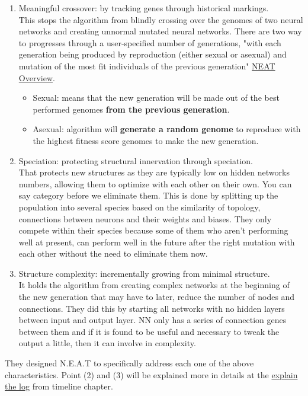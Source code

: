 \begin{enumerate} \label{list:3tweanns}
\item Meaningful crossover: by tracking genes through historical markings.\\
This stops the algorithm from blindly crossing over the genomes of two neural networks and creating unnormal mutated neural networks. There are two way to progresses through a user-specified number of generations, "with each generation being produced by reproduction (either sexual or asexual) and mutation of the most fit individuals of the previous generation" \href{https://neat-python.readthedocs.io/en/latest/neat_overview.html}{NEAT Overview}.
\begin{itemize}
\item Sexual: means that the new generation will be made out of the best performed genomes\textbf{ from the previous generation}.
\item Asexual: algorithm will \textbf{generate a random genome} to reproduce with the highest fitness score genomes to make the new generation.
\end{itemize}

\item Speciation: protecting structural innervation through speciation.\\
That protects new structures as they are typically low on hidden networks numbers, allowing them to optimize with each other on their own. You can say category before we eliminate them. This is done by splitting up the population into several species based on the similarity of topology, connections between neurons and their weights and biases. They only compete within their species because some of them who aren't performing well at present, can perform well in the future after the right mutation with each other without the need to eliminate them now.
\item Structure complexity: incrementally growing from minimal structure.\\
It holds the algorithm from creating complex networks at the beginning of the new generation that may have to later, reduce the number of nodes and connections. They did this by starting all networks with no hidden layers between input and output layer. NN only has a series of connection genes between them and if it is found to be useful and necessary to tweak the output a little, then it can involve in complexity.
\end{enumerate}

They designed N.E.A.T to specifically address each one of the above characteristics. Point (2) and (3) will be explained more in details at the \hyperref[sec:explain-the-log]{explain the log} from timeline chapter.



